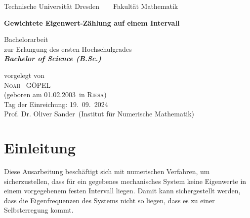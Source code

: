 \documentclass[a4paper,12pt]{report}
\newcommand{\name}{Göpel}
\newcommand{\vorname}{Noah}
\newcommand{\gebdatum}{01.02.2003}
\newcommand{\ort}{Riesa}
\newcommand{\betreuer}{Prof. Dr. Oliver Sander}
\newcommand{\institut}{Institut für Numerische Mathematik}
\newcommand{\thema}{Gewichtete Eigenwert-Zählung auf einem Intervall}
\newcommand{\datum}{19.\ 09.\ 2024} %
\newcommand{\1}{\mathds{1}}
\theoremstyle{plain} %
\theoremstyle{definition} %
\theoremstyle{remark}
\begin{document}

\thispagestyle{empty}

\begin{center}
{\Large Technische Universit\"{a}t Dresden\  \ \textbullet\ \ Fakult\"{a}t Mathematik}

\vfil

{\bfseries\Huge\thema}

\vfil
{\LARGE
Bachelorarbeit \\[\bigskipamount]
zur Erlangung des ersten Hochschulgrades\\[\bigskipamount]
\bfseries{\itshape Bachelor of Science  \textup{(}B.Sc.\textup{)}}\\[\bigskipamount]
}

\vfil\vfil

\vfil

vorgelegt von
\\[\bigskipamount]
\textsc{\vorname\ } \MakeUppercase{\name}
\\[\bigskipamount]
(geboren am \gebdatum\ in \textsc{\ort})
\\[\bigskipamount]
Tag der Einreichung: \datum
\\[\bigskipamount]
\betreuer\ (\institut)
\end{center}

\cleardoublepage
\tableofcontents
\clearpage
\listofsymbols
\clearpage

\chapter{Einleitung}
\label{sec: Einleitung}
      
      Diese Ausarbeitung beschäftigt sich mit numerischen Verfahren, um sicherzustellen, dass für ein gegebenes mechanisches System keine Eigenwerte in einem vorgegebenem festen Intervall liegen.
      Damit kann sichergestellt werden, dass die Eigenfrequenzen des Systems nicht so liegen, dass es zu einer Selbsterregung kommt.

\end{document}
